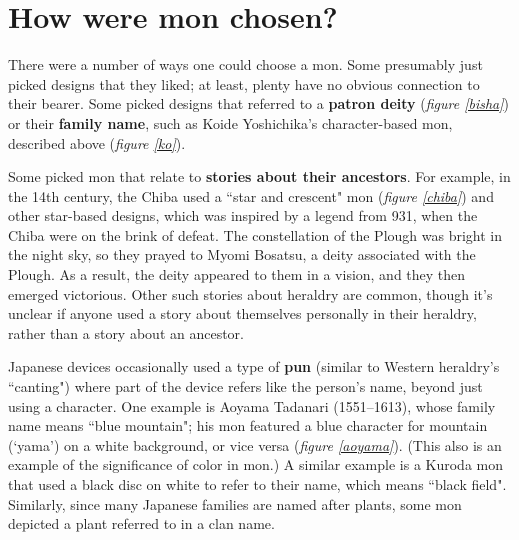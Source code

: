 \documentclass{article}
\begin{document}
  \begin{figure}[b]
  \begin{subfigs}
  \end{subfigs}
  \end{figure}  

\section{How were mon chosen?}

  There were a number of ways one could choose a mon.  Some presumably
  just picked designs that they liked; at least, plenty have no
  obvious connection to their bearer.  Some picked designs that
  referred to a \textbf{patron deity} (\emph{figure \ref{bisha}}) or their
  \textbf{family name}, such as Koide Yoshichika's character-based mon,
  described above (\emph{figure \ref{ko}}).

  Some picked mon that relate to \textbf{stories about their ancestors}.
  For example, in the 14th century, the Chiba used a ``star and
  crescent" mon (\emph{figure \ref{chiba}}) and other star-based designs,
  which was inspired by a legend from 931, when the Chiba were on the
  brink of defeat.  The constellation of the Plough was bright in the
  night sky, so they prayed to Myomi Bosatsu, a deity associated with
  the Plough.  As a result, the deity appeared to them in a vision,
  and they then emerged victorious. Other such
  stories about heraldry are common, though it's unclear if anyone
  used a story about themselves personally in their heraldry, rather
  than a story about an ancestor.

  Japanese devices occasionally used a type of \textbf{pun} (similar to
  Western heraldry's ``canting") where part of the device refers like
  the person's name, beyond just using a character.  One example is Aoyama
  Tadanari (1551--1613), whose family name means ``blue mountain"; his
  mon featured a blue character for mountain (`yama') on a white
  background, or vice versa (\emph{figure
  \ref{aoyama}}). (This
  also is an example of the significance of color in mon.)  A
  similar example is a Kuroda mon that used a black disc on white to
  refer to their name, which means ``black field".
   Similarly, since many Japanese families are named after
  plants, some mon depicted a plant referred to in a clan
  name.
\end{document}
